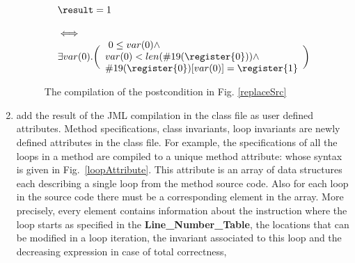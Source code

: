 \begin{enumerate}
\begin{figure}[tb]
 $$\begin{array}{l}
         \result = 1 \\
          \\ 
         \iff \\ 
         \exists  var(0) .
           \biggl(\begin{array}{l} \ 0 \leq var(0) \wedge\\ 
             var(0) < len(\#19(\register{0})) \wedge \\
             \#19(\register{0})[var(0)] = \register{1} 
         \end{array} \biggr) 
   \end{array}
$$
\caption{\sc The compilation of the postcondition in Fig. \ref{replaceSrc}}
\label{postCompile}
\end{figure}





\item add the result of the JML compilation in the class file as user defined attributes. Method specifications, class invariants, loop invariants are 
newly defined attributes in the class file.
 For example, the specifications of all the loops in a method are compiled to a unique method attribute: whose syntax is given in Fig.~\ref{loopAttribute}. This attribute is an array of data structures each describing a single loop from the method source code. Also for each loop in the source code there must be a corresponding element in the array. 
More precisely, every element contains information about the instruction where the loop starts as specified in the
\textbf{Line\_Number\_Table}, the locations that can be modified in a loop iteration, 
 the invariant associated to this loop and the decreasing expression in case of total correctness, 
\end{enumerate}

